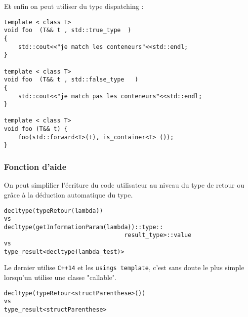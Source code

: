 \documentclass{beamer}
\begin{document}
\begin{frame}[containsverbatim]
Et enfin on peut utiliser du type dispatching :
	\begin{lstlisting}
template < class T>
void foo  (T&& t , std::true_type  )
{
    std::cout<<"je match les conteneurs"<<std::endl;
}

template < class T>
void foo  (T&& t , std::false_type   )
{
    std::cout<<"je match pas les conteneurs"<<std::endl;
}

template < class T>
void foo (T&& t) {
    foo(std::forward<T>(t), is_container<T> ()); 
}
	\end{lstlisting}

\end{frame}

\begin{frame}[containsverbatim]
	\frametitle{Fonction d'aide}
	On peut simplifier l’écriture du code utilisateur au niveau du type de retour ou grâce à la déduction automatique du type.
	\begin{lstlisting}
decltype(typeRetour(lambda))
vs
decltype(getInformationParam(lambda))::type::
                                  result_type>::value
vs
type_result<decltype(lambda_test)> 
	\end{lstlisting}
Le dernier utilise \texttt{C++14} et les \texttt{usings template}, c'est sans doute le plus simple lorsqu'un utilise une classe "callable".
	\begin{lstlisting}
decltype(typeRetour<structParenthese>())
vs
type_result<structParenthese>  
	\end{lstlisting}

\end{frame}
\end{document}
